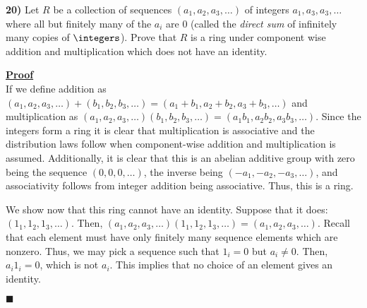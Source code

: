 \documentclass[12pt,a4paper]{article}
\newcommand{\prob}[2]{\textbf{#1)} #2}
\newenvironment{proof}
{
\textbf{\underline{Proof}} \\
}
{
\begin{flushright}
$\blacksquare$
\end{flushright}}
\begin{document}
\prob{20}{Let $R$ be a collection of sequences $(a_1,a_2,a_3,\ldots)$ of integers $a_1,a_3,a_3,\ldots$ where all but finitely many of the $a_i$ are 0 (called the \textit{direct sum} of infinitely many copies of $\integers$). Prove that $R$ is a ring under component wise addition and multiplication which does not have an identity.}

\begin{proof}
If we define addition as $(a_1,a_2,a_3,\ldots) + (b_1,b_2,b_3,\ldots) = (a_1 + b_1,a_2 + b_2,a_3 + b_3,\ldots)$ and multiplication as $(a_1,a_2,a_3,\ldots)(b_1,b_2,b_3,\ldots) = (a_1b_1,a_2b_2,a_3b_3,\ldots)$. Since the integers form a ring it is clear that multiplication is associative and the distribution laws follow when component-wise addition and multiplication is assumed. Additionally, it is clear that this is an abelian additive group with zero being the sequence $(0,0,0,\ldots)$, the inverse being $(-a_1,-a_2,-a_3,\ldots)$, and associativity follows from integer addition being associative. Thus, this is a ring. 

We show now that this ring cannot have an identity. Suppose that it does: $(1_1,1_2,1_3,\ldots)$. Then, $(a_1,a_2,a_3,\ldots)(1_1,1_2,1_3,\ldots) = (a_1,a_2,a_3,\ldots)$. Recall that each element must have only finitely many sequence elements which are nonzero. Thus, we may pick a sequence such that $1_i = 0$ but $a_i \not= 0$. Then, $a_i1_i = 0$, which is not $a_i$. This implies that no choice of an element gives an identity.
\end{proof}
\end{document}
